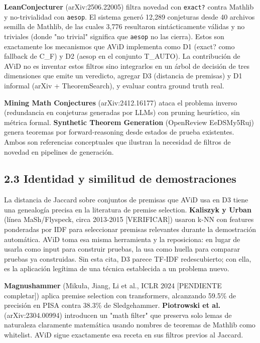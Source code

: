 \documentclass[12pt,a4paper]{article}
\theoremstyle{remark}
\begin{document}
\textbf{LeanConjecturer} (arXiv:2506.22005) filtra novedad con \texttt{exact?} contra Mathlib y no-trivialidad con \texttt{aesop}. El sistema generó 12,289 conjeturas desde 40 archivos semilla de Mathlib, de las cuales 3,776 resultaron sintácticamente válidas y no triviales (donde "no trivial" significa que \texttt{aesop} no las cierra). Estos son exactamente los mecanismos que AViD implementa como D1 (exact? como fallback de C\_F) y D2 (aesop en el conjunto T\_AUTO). La contribución de AViD no es inventar estos filtros sino integrarlos en un árbol de decisión de tres dimensiones que emite un veredicto, agregar D3 (distancia de premisas) y D1 informal (arXiv + TheoremSearch), y evaluar contra ground truth real.


\textbf{Mining Math Conjectures} (arXiv:2412.16177) ataca el problema inverso (redundancia en conjeturas generadas por LLMs) con pruning heurístico, sin métrica formal. \textbf{Synthetic Theorem Generation} (OpenReview EeDSMy5Ruj) genera teoremas por forward-reasoning desde estados de prueba existentes. Ambos son referencias conceptuales que ilustran la necesidad de filtros de novedad en pipelines de generación.


\subsection{2.3 Identidad y similitud de demostraciones}

La distancia de Jaccard sobre conjuntos de premisas que AViD usa en D3 tiene una genealogía precisa en la literatura de premise selection. \textbf{Kaliszyk y Urban} (línea MaSh/Flyspeck, circa 2013-2015 [VERIFICAR]) usaron k-NN con features ponderadas por IDF para seleccionar premisas relevantes durante la demostración automática. AViD toma esa misma herramienta y la reposiciona: en lugar de usarla como input para construir pruebas, la usa como huella para comparar pruebas ya construidas. Sin esta cita, D3 parece TF-IDF redescubierto; con ella, es la aplicación legítima de una técnica establecida a un problema nuevo.


\textbf{Magnushammer} (Mikuła, Jiang, Li et al., ICLR 2024 [PENDIENTE completar]) aplica premise selection con transformers, alcanzando 59.5\% de precisión en PISA contra 38.3\% de Sledgehammer. \textbf{Piotrowski et al.} (arXiv:2304.00994) introducen un "math filter" que preserva solo lemas de naturaleza claramente matemática usando nombres de teoremas de Mathlib como whitelist. AViD sigue exactamente esa receta en sus filtros previos al Jaccard.
\end{document}
